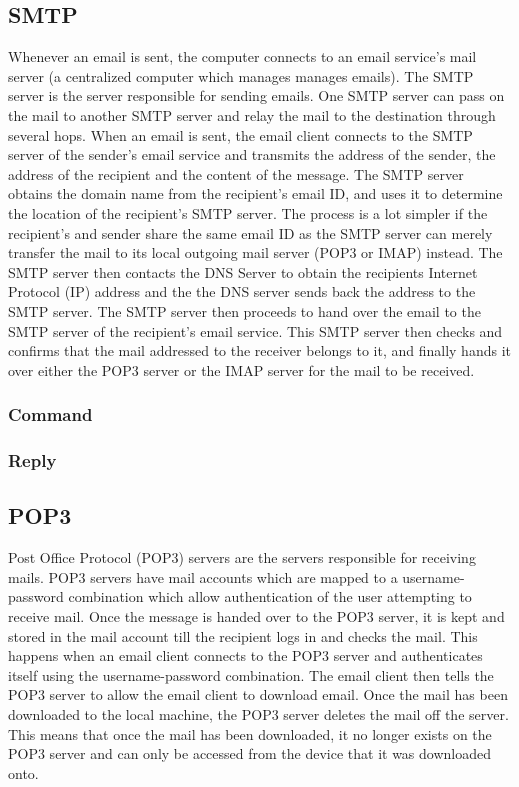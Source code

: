 \documentclass[11pt]{article}
\begin{document}
\begin{multicols}{2}
\subsection{SMTP}
Whenever an email is sent, the computer connects to an email service’s mail server (a centralized computer which manages manages emails). The SMTP server is the server responsible for sending emails. One SMTP server can pass on the mail to another SMTP server and relay the mail to the destination through several hops. When an email is sent, the email client connects to the SMTP server of the sender’s email service and transmits the address of the sender, the address of the recipient and the content of the message. The SMTP server obtains the domain name from the recipient’s email ID, and uses it to determine the location of the recipient's SMTP server. The process is a lot simpler if the recipient’s and sender share the same email ID as the SMTP server can merely transfer the mail to its local outgoing mail server (POP3 or IMAP) instead. The SMTP server then contacts the DNS Server to obtain the recipients Internet Protocol (IP) address and the the DNS server sends back the address to the SMTP server. The SMTP server then proceeds to hand over the email to the SMTP server of the recipient’s email service. This SMTP server then checks and confirms that the mail addressed to the receiver belongs to it, and finally hands it over either the POP3 server or the IMAP server for the mail to be received.
\subsubsection{Command}

\subsubsection{Reply}

\subsection{POP3}
Post Office Protocol (POP3) servers are the servers responsible for receiving mails. POP3 servers have mail accounts which are mapped to a username-password combination which allow authentication of the user attempting to receive mail. Once the message is handed over to the POP3 server, it is kept and stored in the mail account till the recipient logs in and checks the mail. This happens when an email client connects to the POP3 server and authenticates itself using the username-password combination. The email client then tells the POP3 server to allow the email client to download email. Once the mail has been downloaded to the local machine, the POP3 server deletes the mail off the server. This means that once the mail has been downloaded, it no longer exists on the POP3 server and can only be accessed from the device that it was downloaded onto.


\end{multicols}
\end{document}
